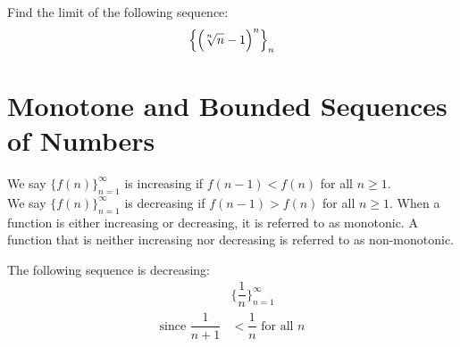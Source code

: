 \begin{exercise}
Find the limit of the following sequence:
\begin{align*}
    \Big\{\Big(\sqrt[\leftroot{2}\uproot{2}n]{n} - 1\Big)^{n}\Big\}_{n}
\end{align*}
\end{exercise}

\newpage
\section{Monotone and Bounded Sequences of Numbers}

\begin{definition}
We say $\{f(n)\}_{n=1}^{\infty}$ is increasing if $f(n-1) < f(n)$ for all $n \geq 1$.\\[1ex]
We say $\{f(n)\}_{n=1}^{\infty}$ is decreasing if $f(n-1) > f(n)$ for all $n \geq 1$. When a function is either increasing or decreasing, it is referred to as monotonic. A function that is neither increasing nor decreasing is referred to as non-monotonic.
\end{definition}

\begin{example}
The following sequence is decreasing:
\begin{align*}
    &\Big\{\dfrac{1}{n}\Big\}_{n=1}^{\infty}\\[2ex]
    \text{since} \hspace{4pt} \dfrac{1}{n+1} &< \dfrac{1}{n} \hspace{4pt} \text{for all} \hspace{4pt} n
\end{align*}
\end{example}

